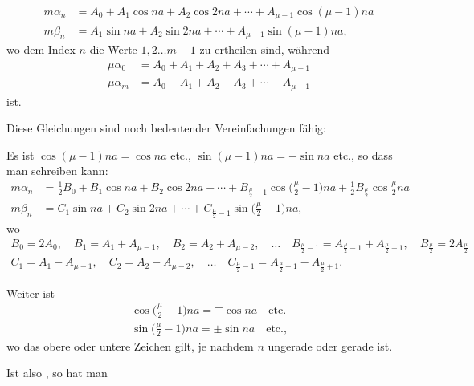 \begin{landscape}
\[
\begin{aligned}
m\alpha_n &= A_0 + A_1\cos na + A_2\cos 2na + \cdots + A_{\mu-1}\cos(\mu-1)na\\
m\beta_n &= A_1\sin na + A_2\sin 2na + \cdots + A_{\mu-1}\sin(\mu-1)na,
\end{aligned}
\]
wo dem Index \(n\) die Werte \(1, 2 \ldots m-1\) zu ertheilen sind, w\"ahrend
\[
\begin{aligned}
\mu\alpha_0 &= A_0 + A_1 + A_2 + A_3 + \cdots + A_{\mu-1}\\
\mu\alpha_m &= A_0 - A_1 + A_2 - A_3 + \cdots - A_{\mu-1}
\end{aligned}
\]
ist.
\par\noindent\hspace*{\parindent}Diese Gleichungen sind noch bedeutender Vereinfachungen f\"ahig:
\par\noindent\hspace*{\parindent}Es ist \(\cos(\mu-1)na = \cos na\) etc., \(\sin(\mu-1)na = -\sin na\) etc., so dass man schreiben kann:
\[
\begin{aligned}
m\alpha_n &= \tfrac12 B_0 + B_1\cos na + B_2\cos 2na + \cdots + B_{\frac{\mu}{2}-1}\cos\Big(\frac{\mu}{2}-1\Big)na + \tfrac12 B_{\frac{\mu}{2}}\cos\frac{\mu}{2}na\\
m\beta_n &= C_1\sin na + C_2\sin 2na + \cdots + C_{\frac{\mu}{2}-1}\sin\Big(\frac{\mu}{2}-1\Big)na,
\end{aligned}
\]
wo
\[
\begin{gathered}
B_0 = 2A_0,\quad B_1 = A_1+A_{\mu-1},\quad B_2 = A_2+A_{\mu-2},\quad \ldots\quad B_{\frac{\mu}{2}-1} = A_{\frac{\mu}{2}-1}+A_{\frac{\mu}{2}+1},\quad B_{\frac{\mu}{2}} = 2A_{\frac{\mu}{2}}\\[4pt]
C_1 = A_1-A_{\mu-1},\quad C_2 = A_2-A_{\mu-2},\quad \ldots\quad C_{\frac{\mu}{2}-1} = A_{\frac{\mu}{2}-1}-A_{\frac{\mu}{2}+1}.
\end{gathered}
\]
\par\noindent\hspace*{\parindent}Weiter ist
\[
\begin{gathered}
\cos\Big(\frac{\mu}{2}-1\Big)na = \mp\cos na \quad \text{etc.}\\[4pt]
\sin\Big(\frac{\mu}{2}-1\Big)na = \pm\sin na \quad \text{etc.,}
\end{gathered}
\]
wo das obere oder untere Zeichen gilt, je nachdem \(n\) ungerade oder gerade ist.
\par\noindent\hspace*{\parindent}Ist also , so hat man

\end{landscape}
